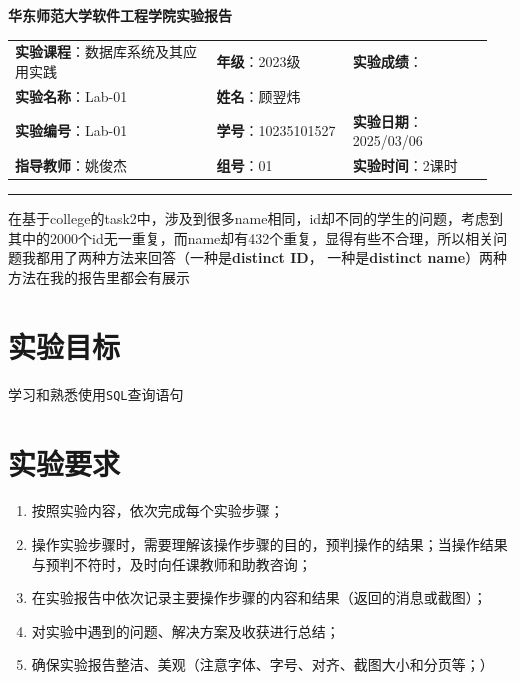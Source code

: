 \documentclass{article}
\begin{document}
	\begin{center}
		{\Large{\textbf{\heiti 华东师范大学软件工程学院实验报告}}}
		\begin{table}[htb]
			\flushleft
			\begin{tabular}{p{0.4\linewidth}p{0.27\linewidth}p{0.28\linewidth}}\\
				\textbf{实验课程}：数据库系统及其应用实践  & \textbf{年级}：2023级       & \textbf{实验成绩}：  \\
				\textbf{实验名称}：Lab-01 & \textbf{姓名}：顾翌炜         &                 \\
				\textbf{实验编号}：Lab-01     & \textbf{学号}：10235101527 & \textbf{实验日期}：2025/03/06  \\
				\textbf{指导教师}：姚俊杰     & \textbf{组号}：01            & \textbf{实验时间}：2课时  \\ 
			\end{tabular}
		\end{table}
	\end{center}
	\rule{\textwidth}{2pt}
	
	\begin{tcolorbox}[title = {备注}, colback = blue!25!white, colframe = blue!75!black]
		在基于college的task2中，涉及到很多name相同，id却不同的学生的问题，考虑到其中的2000个id无一重复，而name却有432个重复，显得有些不合理，所以相关问题我都用了两种方法来回答（一种是\textbf{distinct ID}， 一种是\textbf{distinct name}）两种方法在我的报告里都会有展示
	\end{tcolorbox}
	
    \section{实验目标}
    
    学习和熟悉使用\texttt{SQL}查询语句
    
    \section{实验要求}
    
    \begin{enumerate}[noitemsep, label={{\arabic*})}]
    	\item 按照实验内容，依次完成每个实验步骤；
    	
    	\item 操作实验步骤时，需要理解该操作步骤的目的，预判操作的结果；当操作结果与预判不符时，及时向任课教师和助教咨询；
    	
    	\item 在实验报告中依次记录主要操作步骤的内容和结果（返回的消息或截图）；
    	
    	\item 对实验中遇到的问题、解决方案及收获进行总结；
    	
    	\item 确保实验报告整洁、美观（注意字体、字号、对齐、截图大小和分页等；）
    	
    \end{enumerate}\textbf{}
    
\end{document}
